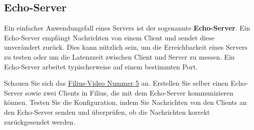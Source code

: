 \subsection{Echo-Server}
Ein einfacher Anwendungsfall eines Servers ist der sogenannte \textbf{Echo-Server}. Ein Echo-Server empfängt Nachrichten von einem Client und sendet diese unverändert zurück. Dies kann nützlich sein, um die Erreichbarkeit eines Servers zu testen oder um die Latenzzeit zwischen Client und Server zu messen. Ein Echo-Server arbeitet typischerweise auf einem bestimmten Port.

\begin{myexercise}\label{ex:filius-echo-server}
	Schauen Sie sich das \href{https://www.youtube.com/watch?v=Kn8v_HrckUM&list=PLUfZiVdJui-57k0VcRecHX0JTEhOMgiKP}{Filius-Video Nummer 5} an. Erstellen Sie selber einen Echo-Server sowie zwei Clients in Filius, die mit dem Echo-Server kommunizieren können. Testen Sie die Konfiguration, indem Sie Nachrichten von den Clients an den Echo-Server senden und überprüfen, ob die Nachrichten korrekt zurückgesendet werden.
\end{myexercise}

